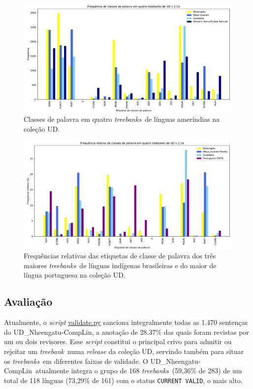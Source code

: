 \documentclass[portuguese]{textolivre}
\newcommand{\udc}{coleção UD}
\newcommand{\tbc}{UD\_Nheengatu-CompLin}
\newcommand{\tbs}{\textit{treebanks}}
\newcommand{\tb}{\textit{treebank}}
\begin{document}
\begin{figure}[htbp]
  \centering
  \begin{minipage}{.75\textwidth}
    \includegraphics[width=\linewidth]{figures/TagFreq4TBs.pdf}
    \caption{Classes de palavra em quatro \tbs~de línguas ameríndias na \udc.}
    \label{fig:tag-freq}
  \end{minipage}
\end{figure}

\begin{figure}[htbp]
  \centering
  \begin{minipage}{.75\textwidth}
    \includegraphics[width=\linewidth]{figures/RelTagFreq4TBsCINTIL.pdf}
    \caption{Frequências relativas das etiquetas de classe de palavra dos três maiores \tbs~de línguas indígenas brasileiras e do maior de língua portuguesa na \udc.}
    \label{fig:rel-tag-freq}
  \end{minipage}
\end{figure}

\subsection{Avaliação}\label{avaliacao}
Atualmente, o \textit{script} \href{https://github.com/UniversalDependencies/tools/blob/master/validate.py}{validate.py} sanciona integralmente todas as 1.470 sentenças do \tbc, a anotação de 28.37\% das quais foram revistas por um ou dois revisores. Esse \textit{script} constitui o principal crivo para admitir ou rejeitar um \tb~numa \textit{release} da \udc, servindo também para situar os \tbs~em diferentes faixas de validade. O \tbc~atualmente integra o grupo de 168 \tbs~(59,36\% de 283) de um total de 118 línguas (73,29\% de 161) com o status \texttt{CURRENT VALID}, o mais alto. 
\end{document}
